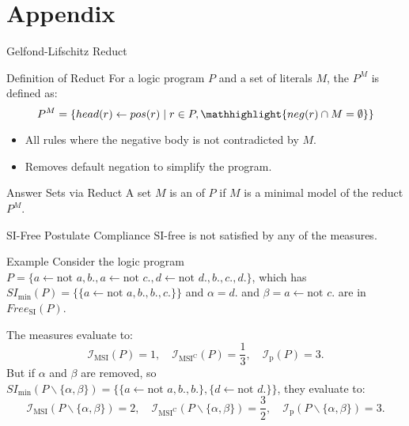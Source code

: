 \section{Appendix}

\begin{frame}{Gelfond-Lifschitz Reduct}
    \begin{block}{Definition of Reduct}
        For a logic program \(P\) and a set of literals \(M\), the  \(P^M\) is defined as:
        \[
            P^M = \{head(r) \leftarrow pos(r) \mid r \in P, \mathhighlight{neg(r) \cap M = \emptyset}\}
        \]
        \begin{itemize}
            \item All rules where the negative body is not contradicted by \(M\).
            \item Removes default negation to simplify the program.
        \end{itemize}
    \end{block}
    \begin{block}{Answer Sets via Reduct}
        A set \(M\) is an  of \(P\) if \(M\) is a minimal model of the reduct \(P^M\).
    \end{block}
\end{frame}

\begin{frame}{SI-Free Postulate Compliance}
    SI-free is not satisfied by any of the measures.
    \begin{exampleblock}{Example}
        Consider the logic program \(P = \{a \leftarrow \text{not } a, b., a \leftarrow \text{not }c., d \leftarrow \text{not }d., b., c., d.\}\), which has \(SI_{\min}(P) = \{\{a \leftarrow \text{not }a, b., b., c.\}\}\)
        and \(\alpha = d.\) and \(\beta = a \leftarrow \text{not }c.\) are in \(Free_{\text{SI}}(P)\).

        The measures evaluate to:
        \[
            \mathcal{I}_{\text{MSI}}(P) = 1,\quad \mathcal{I}_{\text{MSI}^\text{C}}(P) = \frac{1}{3},\quad \mathcal{I}_{\text{p}}(P) = 3.
        \]
        But if \(\alpha\) and \(\beta\) are removed, so \(SI_{\min}(P \backslash \{\alpha,\beta\}) = \{\{a \leftarrow \text{not }a, b., b.\}, \{d \leftarrow \text{not }d.\}\}\), they evaluate to:
        \[
            \mathcal{I}_{\text{MSI}}(P \backslash \{\alpha,\beta\}) = 2,\quad \mathcal{I}_{\text{MSI}^\text{C}}(P \backslash \{\alpha,\beta\}) = \frac{3}{2},\quad \mathcal{I}_{\text{p}}(P \backslash \{\alpha,\beta\}) = 3.
        \]
    \end{exampleblock}
\end{frame}
